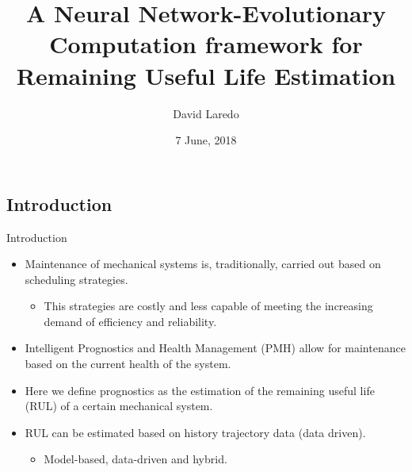 \documentclass{beamer}
\title{A Neural Network-Evolutionary Computation framework for Remaining Useful Life Estimation} %
\subtitle{David Laredo} %
\author{7 June, 2018}
\begin{document}
  \frame{\maketitle}


  \begin{darkframes}
    
    \section{Introduction}
    
    \begin{frame}[label=introduction]{Introduction}
      
	\begin{itemize}
		\item Maintenance of mechanical systems is, traditionally, carried out based on scheduling strategies.
		\begin{itemize}
			\item This strategies are costly and less capable of meeting the increasing demand of efficiency and reliability.
		\end{itemize}
		
		\item Intelligent Prognostics and Health Management (PMH) allow for maintenance based on the current health of the system.
		\item Here we define prognostics as the estimation of the remaining useful life (RUL) of a certain mechanical system.
	\end{itemize}      
      	
    \end{frame}
    
      \begin{frame}
      
      	\begin{itemize}
		\item RUL can be estimated based on history trajectory data (data driven).
		\begin{itemize}
			\item Model-based, data-driven and hybrid.
		\end{itemize}
		

\end{itemize}
\end{frame}
\end{darkframes}
\end{document}
